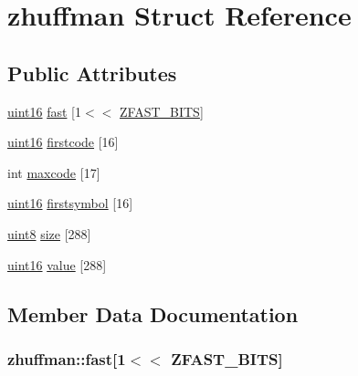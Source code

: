 \hypertarget{structzhuffman}{}\section{zhuffman Struct Reference}
\label{structzhuffman}
\subsection*{Public Attributes}
\begin{DoxyCompactItemize}
\item 
\hyperlink{stb__image_8c_a05f6b0ae8f6a6e135b0e290c25fe0e4e}{uint16} \hyperlink{structzhuffman_a12d5f92a121b65680e5f0b4027d00c96}{fast} \mbox{[}1$<$$<$ \hyperlink{stb__image_8c_a37d8564ae0a820fb44b1a751c702e33a}{Z\+F\+A\+S\+T\+\_\+\+B\+I\+T\+S}\mbox{]}
\item 
\hyperlink{stb__image_8c_a05f6b0ae8f6a6e135b0e290c25fe0e4e}{uint16} \hyperlink{structzhuffman_a81f5ae5bd31b40439955de6154572917}{firstcode} \mbox{[}16\mbox{]}
\item 
int \hyperlink{structzhuffman_ac7dd4a2bf01a6e27933dd1cf6b0cc762}{maxcode} \mbox{[}17\mbox{]}
\item 
\hyperlink{stb__image_8c_a05f6b0ae8f6a6e135b0e290c25fe0e4e}{uint16} \hyperlink{structzhuffman_afbdb21fd99f413fc8f9e58243552fe95}{firstsymbol} \mbox{[}16\mbox{]}
\item 
\hyperlink{stb__image_8c_adde6aaee8457bee49c2a92621fe22b79}{uint8} \hyperlink{structzhuffman_a46ce4d4a4d7fc41c2560616f6696e9b9}{size} \mbox{[}288\mbox{]}
\item 
\hyperlink{stb__image_8c_a05f6b0ae8f6a6e135b0e290c25fe0e4e}{uint16} \hyperlink{structzhuffman_acc395b638b700b944c329d71a8b82084}{value} \mbox{[}288\mbox{]}
\end{DoxyCompactItemize}


\subsection{Member Data Documentation}
\hypertarget{structzhuffman_a12d5f92a121b65680e5f0b4027d00c96}{}
\subsubsection[{fast}]{ zhuffman\+::fast\mbox{[}1$<$$<$ {\bf Z\+F\+A\+S\+T\+\_\+\+B\+I\+T\+S}\mbox{]}}\label{structzhuffman_a12d5f92a121b65680e5f0b4027d00c96}
\hypertarget{structzhuffman_a81f5ae5bd31b40439955de6154572917}{}
